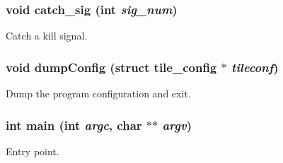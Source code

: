 \subsubsection{\setlength{\rightskip}{0pt plus 5cm}void catch\_\-sig (int {\em sig\_\-num})}\label{tile_8c_a1}


Catch a kill signal. 

\subsubsection{\setlength{\rightskip}{0pt plus 5cm}void dump\-Config (struct {\bf tile\_\-config} $\ast$ {\em tileconf})}\label{tile_8c_a2}


Dump the program configuration and exit. 

\subsubsection{\setlength{\rightskip}{0pt plus 5cm}int main (int {\em argc}, char $\ast$$\ast$ {\em argv})}\label{tile_8c_a0}


Entry point. 

